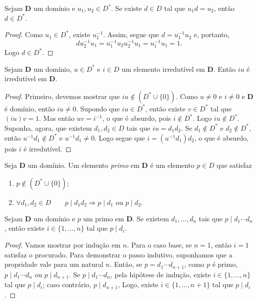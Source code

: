 \begin{prop}
	Sejam $\bm D$ um domínio e $u_1,u_2 \in D^*$. Se existe $d \in D$ tal que $u_1d=u_2$, então $d \in D^*$.
\end{prop}
\begin{proof}
	Como $u_1 \in D^*$, existe $u_1^{-1}$. Assim, segue que $d=u_1^{-1}u_2$ e, portanto,
	\begin{equation*}
	du_2^{-1}u_1=u_1^{-1}u_2u_2^{-1}u_1=u_1^{-1}u_1=1.
	\end{equation*}
Logo $d \in D^*$.
\end{proof}

\begin{prop}
	Sejam $\bm D$ um domínio, $u \in D^*$ e $i \in D$ um elemento irredutível em $\bm D$. Então $iu$ é irredutível em $\bm D$.
\end{prop}
\begin{proof}
	Primeiro, devemos mostrar que $iu \notin (D^* \cup \{0\})$. Como $u \neq 0$ e $i \neq 0$ e $\bm D$ é domínio, então $iu \neq 0$. Supondo que $iu \in D^*$, então existe $v \in D^*$ tal que $(iu)v=1$. Mas então $uv=i^{-1}$, o que é absurdo, pois $i \notin D^*$. Logo $iu \notin D^*$. Suponha, agora, que existem $d_1,d_2 \in D$ tais que $iu=d_1d_2$. Se $d_1 \notin D^*$ e $d_2 \notin D^*$, então $u^{-1}d_1 \notin D^*$ e $u^{-1}d_1 \neq 0$. Logo segue que $i=(u^{-1}d_1)d_2$, o que é absurdo, pois $i$ é irredutível.
\end{proof}

\begin{defi}
	Seja $\bm D$ um domínio. Um elemento \emph{primo} em $\bm D$ é um elemento $p \in D$ que satisfaz
	\begin{enumerate}
	\item  $p \notin (D^* \cup \{0\})$;
	\item $\forall d_1,d_2 \in D \qquad p \mid d_1d_2 \Rightarrow p \mid d_1 \text{\ \ ou\ \ } p \mid d_2.$
	\end{enumerate}
\end{defi}

\begin{prop}
	Sejam $\bm D$ um domínio e $p$ um primo em $\bm D$. Se existem $d_1,\ldots,d_n$ tais que $p \mid d_1 \cdots d_n$, então existe $i \in \{1,\ldots,n\}$ tal que $p \mid d_i$.
\end{prop}
\begin{proof}
	Vamos mostrar por indução em $n$. Para o caso base, se $n=1$, então $i=1$ satisfaz o procurado. Para demonstrar o passo indutivo, suponhamos que a propridade vale para um natural $n$. Então, se $p=d_1 \cdots d_{n+1}$, como $p$ é primo, $p \mid d_1 \cdots d_n$ ou $p \mid d_{n+1}$. Se $p \mid d_1 \cdots d_n$, pela hipótese de indução, existe $i \in \{1,\ldots,n\}$ tal que $p \mid d_i$; caso contrário, $p \mid d_{n+1}$, Logo, existe $i \in \{1,\ldots,n+1\}$ tal que $p \mid d_i$.
\end{proof}

